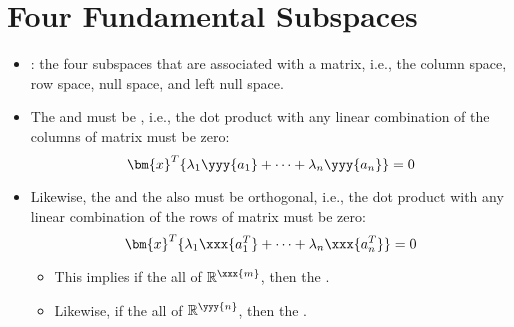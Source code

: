 \section{Four Fundamental Subspaces}\label{Four Fundamental Subspaces}
\begin{itemize}
  \item {}: the four subspaces that are associated with a matrix, i.e., the column space, row space, null space, and left null space.
  \item The  and  must be \hyperref[Geometric Interpretation of the Dot Product]{}, i.e., the dot product with any linear combination of the columns of matrix  must be zero:
  \[%
  \bm{x}^T\{\lambda_1 \yyy{a_1} + \cdots + \lambda_n \yyy{a_n}\} = 0
  \]%
  \item Likewise, the  and the  also must be orthogonal, i.e., the dot product with any linear combination of the rows of matrix  must be zero:
  \[%
  \bm{x}^T\{\lambda_1 \xxx{a_1^T} + \cdots + \lambda_n \xxx{a_n^T}\} = 0
  \]%
  \begin{itemize}
    \item This implies if the  all of \(\mathbb{R}^\xxx{m}\), then the .
    \item Likewise, if the  all of \(\mathbb{R}^\yyy{n}\), then the .
  \end{itemize}
  

\end{itemize}
